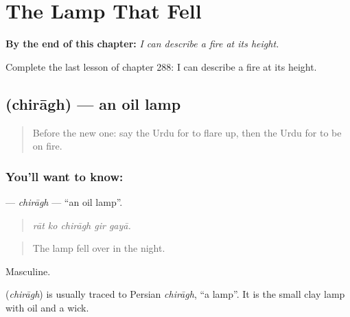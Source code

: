 
\chapter{The Lamp That Fell}
\label{ch:ur-the-lamp-that-fell}

\begin{chapteropening}
\textbf{By the end of this chapter:} \emph{I can describe a fire at its height.}

Complete the last lesson of chapter 288: I can describe a fire at its height.
\end{chapteropening}

\section[\texorpdfstring{\ur{چراغ} (chirāgh)}{چراغ (chirāgh)}]{ (chirāgh) — an oil lamp}

\label{lesson:UR-C288-chiragh}



\begin{quote}
Before the new one: say the Urdu for to flare up, then the Urdu for to be on fire.
\end{quote}

\subsection*{You'll want to know: }
\textbf{} — \emph{chirāgh} — \textquotedblleft{}an oil lamp\textquotedblright{}.

\begin{quote}
    
\end{quote}

\begin{quote}
\emph{rāt ko chirāgh gir gayā.}
\end{quote}

\begin{quote}
The lamp fell over in the night.
\end{quote}

Masculine.

\begin{cousinweb}
\textbf{} (\emph{chirāgh}) is usually traced to Persian \emph{chirāgh}, \textquotedblleft{}a lamp\textquotedblright{}. It is the small clay lamp with oil and a wick.
\end{cousinweb}

